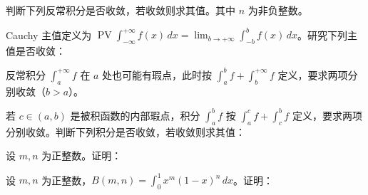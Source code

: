 \noindent\begin{minipage}{\textwidth}
判断下列反常积分是否收敛，若收敛则求其值。其中 $n$ 为非负整数。
\end{minipage}\par\vfill
\noindent\begin{minipage}{\textwidth}
Cauchy 主值定义为 $\operatorname{PV}\int_{-\infty}^{+\infty}f(x)\,dx=\lim_{b\to+\infty}\int_{-b}^b f(x)\,dx$。研究下列主值是否收敛：
\end{minipage}\par\vfill
\noindent\begin{minipage}{\textwidth}
反常积分 $\int_a^{+\infty}f$ 在 $a$ 处也可能有瑕点，此时按 $\int_a^b f+\int_b^{+\infty}f$ 定义，要求两项分别收敛（$b>a$）。
\end{minipage}\par\vfill
\newpage
\noindent\begin{minipage}{\textwidth}
若 $c\in(a,b)$ 是被积函数的内部瑕点，积分 $\int_a^b f$ 按 $\int_a^c f+\int_c^b f$ 定义，要求两项分别收敛。判断下列积分是否收敛，若收敛则求其值：
\end{minipage}\par\vfill
\noindent\begin{minipage}{\textwidth}
设 $m,n$ 为正整数。证明：
\end{minipage}\par\vfill
\noindent\begin{minipage}{\textwidth}
设 $m,n$ 为正整数，$B(m,n)=\int_0^1x^m(1-x)^n\,dx$。证明：
\end{minipage}\par\vfill
